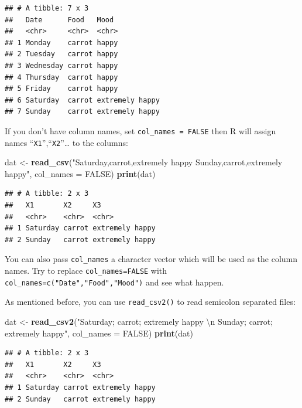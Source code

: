 \documentclass[12pt,]{krantz}
\makeatletter
\newenvironment{Shaded}{\begin{snugshade}}{\end{snugshade}}
\newcommand{\CharTok}[1]{\textcolor[rgb]{0.5,0.5,0.5}{#1}}
\newcommand{\DataTypeTok}[1]{\textcolor[rgb]{0.27,0.27,0.27}{#1}}
\newcommand{\KeywordTok}[1]{\textcolor[rgb]{0.27,0.27,0.27}{\textbf{#1}}}
\newcommand{\NormalTok}[1]{#1}
\newcommand{\OtherTok}[1]{\textcolor[rgb]{0.37,0.37,0.37}{#1}}
\newcommand{\StringTok}[1]{\textcolor[rgb]{0.5,0.5,0.5}{#1}}
\newenvironment{kframe}{%
\medskip{}
\setlength{\fboxsep}{.8em}
 \def\at@end@of@kframe{}%
 \ifinner\ifhmode%
  \def\at@end@of@kframe{\end{minipage}}%
  \begin{minipage}{\columnwidth}%
 \fi\fi%
 \def\FrameCommand##1{\hskip\@totalleftmargin \hskip-\fboxsep
 \colorbox{shadecolor}{##1}\hskip-\fboxsep
     \hskip-\linewidth \hskip-\@totalleftmargin \hskip\columnwidth}%
 \MakeFramed {\advance\hsize-\width
   \@totalleftmargin\z@ \linewidth\hsize
   \@setminipage}}%
 {\par\unskip\endMakeFramed%
 \at@end@of@kframe}
\renewenvironment{Shaded}{\begin{kframe}}{\end{kframe}}
\makeatother
\begin{document}
\begin{verbatim}
## # A tibble: 7 x 3
##   Date      Food   Mood           
##   <chr>     <chr>  <chr>          
## 1 Monday    carrot happy          
## 2 Tuesday   carrot happy          
## 3 Wednesday carrot happy          
## 4 Thursday  carrot happy          
## 5 Friday    carrot happy          
## 6 Saturday  carrot extremely happy
## 7 Sunday    carrot extremely happy
\end{verbatim}

If you don't have column names, set \texttt{col\_names\ =\ FALSE} then R will assign names ``\texttt{X1}'',``\texttt{X2}''\ldots{} to the columns:

\begin{Shaded}
\begin{Highlighting}[]
\NormalTok{dat <-}\StringTok{ }\KeywordTok{read_csv}\NormalTok{(}\StringTok{"Saturday,carrot,extremely happy}
\StringTok{          Sunday,carrot,extremely happy"}\NormalTok{, }\DataTypeTok{col_names =} \OtherTok{FALSE}\NormalTok{)}
\KeywordTok{print}\NormalTok{(dat)}
\end{Highlighting}
\end{Shaded}

\begin{verbatim}
## # A tibble: 2 x 3
##   X1       X2     X3             
##   <chr>    <chr>  <chr>          
## 1 Saturday carrot extremely happy
## 2 Sunday   carrot extremely happy
\end{verbatim}

You can also pass \texttt{col\_names} a character vector which will be used as the column names. Try to replace \texttt{col\_names=FALSE} with \texttt{col\_names=c("Date","Food","Mood")} and see what happen.

As mentioned before, you can use \texttt{read\_csv2()} to read semicolon separated files:

\begin{Shaded}
\begin{Highlighting}[]
\NormalTok{dat <-}\StringTok{ }\KeywordTok{read_csv2}\NormalTok{(}\StringTok{"Saturday; carrot; extremely happy }\CharTok{\textbackslash{}n}\StringTok{ }
\StringTok{                 Sunday; carrot; extremely happy"}\NormalTok{, }\DataTypeTok{col_names =} \OtherTok{FALSE}\NormalTok{)}
\KeywordTok{print}\NormalTok{(dat)}
\end{Highlighting}
\end{Shaded}

\begin{verbatim}
## # A tibble: 2 x 3
##   X1       X2     X3             
##   <chr>    <chr>  <chr>          
## 1 Saturday carrot extremely happy
## 2 Sunday   carrot extremely happy
\end{verbatim}
\end{document}
